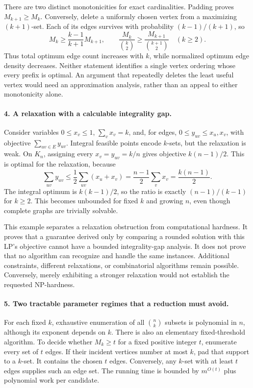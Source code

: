 \documentclass[11pt]{article}
\begin{document}
There are two distinct monotonicities for exact cardinalities. Padding proves $M_{k+1}\ge M_k$. Conversely, delete a uniformly chosen vertex from a maximizing $(k+1)$-set. Each of its edges survives with probability $(k-1)/(k+1)$, so
\[
 M_k\ge\frac{k-1}{k+1}M_{k+1},\qquad
 \frac{M_k}{\binom{k}{2}}
 \ge\frac{M_{k+1}}{\binom{k+1}{2}}
 \quad(k\ge2).
\]
Thus total optimum edge count increases with $k$, while normalized optimum edge density decreases. Neither statement identifies a single vertex ordering whose every prefix is optimal. An argument that repeatedly deletes the least useful vertex would need an approximation analysis, rather than an appeal to either monotonicity alone.

\paragraph{4. A relaxation with a calculable integrality gap.}
Consider variables $0\le x_v\le1$, $\sum_vx_v=k$, and, for edges, $0\le y_{uv}\le x_u,x_v$, with objective $\sum_{uv\in E}y_{uv}$. Integral feasible points encode $k$-sets, but the relaxation is weak. On $K_n$, assigning every $x_v=y_{uv}=k/n$ gives objective $k(n-1)/2$. This is optimal for the relaxation, because
\[
 \sum_{uv}y_{uv}\le\frac12\sum_{uv}(x_u+x_v)
 =\frac{n-1}{2}\sum_vx_v=\frac{k(n-1)}2.
\]
The integral optimum is $k(k-1)/2$, so the ratio is exactly $(n-1)/(k-1)$ for $k\ge2$. This becomes unbounded for fixed $k$ and growing $n$, even though complete graphs are trivially solvable.

This example separates a relaxation obstruction from computational hardness. It proves that a guarantee derived only by comparing a rounded solution with this LP's objective cannot have a bounded integrality-gap analysis. It does not prove that no algorithm can recognize and handle the same instances. Additional constraints, different relaxations, or combinatorial algorithms remain possible. Conversely, merely exhibiting a stronger relaxation would not establish the requested NP-hardness.

\paragraph{5. Two tractable parameter regimes that a reduction must avoid.}
For each fixed $k$, exhaustive enumeration of all $\binom nk$ subsets is polynomial in $n$, although its exponent depends on $k$. There is also an elementary fixed-threshold algorithm. To decide whether $M_k\ge t$ for a fixed positive integer $t$, enumerate every set of $t$ edges. If their incident vertices number at most $k$, pad that support to a $k$-set. It contains the chosen $t$ edges. Conversely, any $k$-set with at least $t$ edges supplies such an edge set. The running time is bounded by $m^{O(t)}$ plus polynomial work per candidate.
\end{document}
